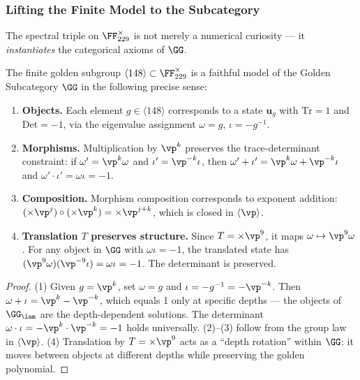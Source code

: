 \subsubsection*{Lifting the Finite Model to the Subcategory}

The spectral triple on $\FF_{229}^\times$ is not merely a numerical curiosity --- it \emph{instantiates} the categorical axioms of $\GG$.

\begin{proposition}\label{prop:faithful}
The finite golden subgroup $\langle 148 \rangle \subset \FF_{229}^\times$ is a faithful model of the Golden Subcategory $\GG$ in the following precise sense:
\begin{enumerate}
\item \textbf{Objects.} Each element $g \in \langle 148 \rangle$ corresponds to a state $\mathbf{u}_g$ with $\mathrm{Tr} = 1$ and $\mathrm{Det} = -1$, via the eigenvalue assignment $\omega = g$, $\iota = -g^{-1}$.
\item \textbf{Morphisms.} Multiplication by $\vp^k$ preserves the trace-determinant constraint: if $\omega' = \vp^k \omega$ and $\iota' = \vp^{-k}\iota$, then $\omega' + \iota' = \vp^k\omega + \vp^{-k}\iota$ and $\omega' \cdot \iota' = \omega\iota = -1$.
\item \textbf{Composition.} Morphism composition corresponds to exponent addition: $(\times\vp^j) \circ (\times\vp^k) = \times\vp^{j+k}$, which is closed in $\langle\vp\rangle$.
\item \textbf{Translation $T$ preserves structure.} Since $T = \times\vp^9$, it maps $\omega \mapsto \vp^9\omega$. For any object in $\GG$ with $\omega\iota = -1$, the translated state has $(\vp^9\omega)(\vp^{-9}\iota) = \omega\iota = -1$. The determinant is preserved.
\end{enumerate}
\end{proposition}
\begin{proof}
(1) Given $g = \vp^k$, set $\omega = g$ and $\iota = -g^{-1} = -\vp^{-k}$. Then $\omega + \iota = \vp^k - \vp^{-k}$, which equals 1 only at specific depths --- the objects of $\GG_\lam$ are the depth-dependent solutions. The determinant $\omega \cdot \iota = -\vp^k \cdot \vp^{-k} = -1$ holds universally. (2)--(3) follow from the group law in $\langle\vp\rangle$. (4) Translation by $T = \times\vp^9$ acts as a ``depth rotation'' within $\GG$: it moves between objects at different depths while preserving the golden polynomial. \qedhere
\end{proof}

